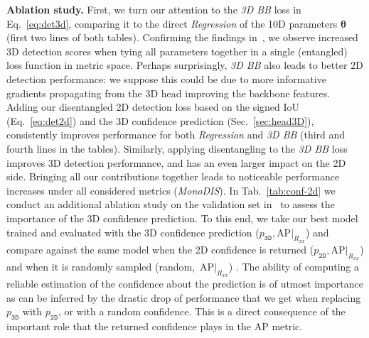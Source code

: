 \documentclass[10pt,twocolumn,letterpaper]{article}
\newcommand{\monodis}{MonoDIS}
\renewcommand{\paragraph}[1]{

        \vspace{3pt}
	\noindent\textbf{#1}}
\begin{document}
\paragraph{Ablation study.}
First, we turn our attention to the \textit{3D BB} loss in Eq.~\eqref{eq:det3d}, comparing it to the direct \textit{Regression} of the 10D parameters $\boldsymbol{\theta}$~\cite{Manhardt_2019_CVPR} (first two lines of both tables).
Confirming the findings in~\cite{Manhardt_2019_CVPR}, we observe increased 3D detection scores when tying all parameters together in a single (entangled) loss function in metric space.
Perhaps surprisingly, \textit{3D BB} also leads to better 2D detection performance: we suppose this could be due to more informative gradients propagating from the 3D head improving the backbone features.
Adding our disentangled 2D detection loss based on the signed IoU (Eq.~\eqref{eq:det2d}) and the 3D confidence prediction (Sec.~\ref{sec:head3D}), consistently improves performance for both \textit{Regression} and \textit{3D BB} (third and fourth lines in the tables).
Similarly, applying disentangling to the \textit{3D BB} loss improves 3D detection performance, and has an even larger impact on the 2D side.
Bringing all our contributions together leads to noticeable performance increases under all considered metrics (\textit{\monodis}).
In Tab.~\ref{tab:conf-2d} we conduct an additional ablation study on the validation set in~\cite{NIPS2015_Chen} to assess the importance of the 3D confidence prediction. To this end, we take our best model trained and evaluated with the 3D confidence prediction ($p_\mathtt{3D}, \text{AP}|_{R_{xx}}$) and compare against the same model when the 2D confidence is returned ($p_\mathtt{2D}, \text{AP}|_{R_{xx}}$) and when it is randomly sampled (random,~$\text{AP}|_{R_{xx}}$) . The ability of computing a reliable estimation of the confidence about the prediction is of utmost importance as can be inferred by the drastic drop of performance that we get when replacing $p_\mathtt{3D}$ with $p_\mathtt{2D}$, or with a random confidence. This is a direct consequence of the important role that the returned confidence plays in the AP metric.
\end{document}
